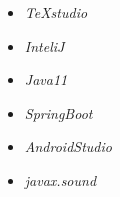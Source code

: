 \begin{itemize}
	\item \textit{TeXstudio}
	\item \textit{InteliJ}
	\item \textit{Java11}
	\item \textit{SpringBoot}
	\item \textit{AndroidStudio}
	\item \textit{javax.sound}
\end{itemize}